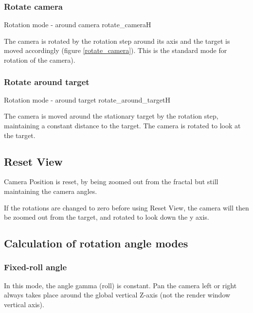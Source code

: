 \subsubsection{Rotate camera}\label{rotate-camera}

{Rotation mode - around camera}
{rotate_camera}{H}

The camera is rotated by the rotation step around its axis and the target is
moved accordingly (figure \ref{rotate_camera}). This is the standard mode for rotation of the camera).

\subsubsection{Rotate around target}\label{rotate-around-target}

{Rotation mode - around target}
{rotate_around_target}{H}

The camera is moved around the stationary target by the rotation step,
maintaining a constant distance to the target. The camera is rotated to look at
the target.

\subsection{Reset View}\label{reset-view}

Camera Position is reset, by being zoomed out from the fractal but still
maintaining the camera angles.

If the rotations are changed to zero before using Reset View, the camera will
then be zoomed out from the target, and rotated to look down the y axis.

\subsection{Calculation of rotation angle
	modes}\label{calculation-of-rotation-angle-modes}

\subsubsection{Fixed-roll angle}\label{fixed-roll-angle}

In this mode, the angle gamma (roll) is constant. Pan the camera left or right
always takes place around the global vertical Z-axis (not the render window
vertical axis).

